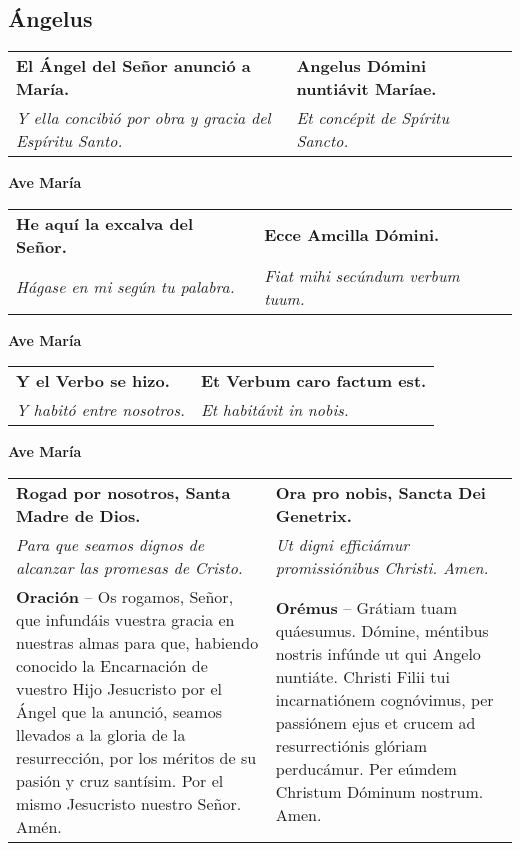 \documentclass[../devocionario.tex]{subfiles}
\begin{document}
    \subsection*{Ángelus}

    \begin{tabular} { p{} p{} }
        \textbf{El Ángel del Señor anunció a María.} & \textbf{Angelus Dómini nuntiávit Maríae.}\\
        \textit{Y ella concibió por obra y gracia del Espíritu Santo.} & 
        \textit{Et concépit de Spíritu Sancto.}
    \end{tabular}

    \begin{center}
        \textbf{Ave María}
    \end{center}

    \begin{tabular} { p{} p{} }
        \textbf{He aquí la excalva del Señor.} & \textbf{Ecce Amcilla Dómini.}\\
        \textit{Hágase en mi según tu palabra.} & 
        \textit{Fiat mihi secúndum verbum tuum.}
    \end{tabular}

    \begin{center}
        \textbf{Ave María}
    \end{center}

    \begin{tabular} { p{} p{} }
        \textbf{Y el Verbo se hizo.} & \textbf{Et Verbum caro factum est.}\\
        \textit{Y habitó entre nosotros.} & 
        \textit{Et habitávit in nobis.}
    \end{tabular}

    \begin{center}
        \textbf{Ave María}
    \end{center}

    \begin{tabular} { p{} p{} }
        \textbf{Rogad por nosotros, Santa Madre de Dios.} & \textbf{Ora pro nobis, Sancta Dei Genetrix.}\\
        \textit{Para que seamos dignos de alcanzar las promesas de Cristo.} & 
        \textit{Ut digni efficiámur promissiónibus Christi. Amen.}\\
        \textbf{Oración} -- Os rogamos, Señor, que infundáis vuestra gracia en nuestras almas para que, 
        habiendo conocido la Encarnación de vuestro Hijo Jesucristo por el Ángel que la anunció, 
        seamos llevados a la gloria de la resurrección, por los méritos de su pasión y cruz santísim. 
        Por el mismo Jesucristo nuestro Señor. Amén. & 
        \textbf{Orémus} -- Grátiam tuam quáesumus. Dómine, méntibus nostris infúnde ut qui Angelo nuntiáte. 
        Christi Filii tui incarnatiónem cognóvimus, per passiónem ejus et crucem ad resurrectiónis glóriam perducámur. 
        Per eúmdem Christum Dóminum nostrum. Amen.
    \end{tabular}
\end{document}
